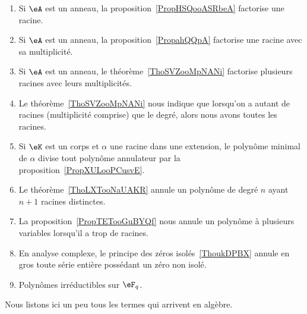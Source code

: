\begin{description}
    \begin{enumerate}
        \item
            Si \( \eA\) est un anneau, la proposition~\ref{PropHSQooASRbeA} factorise une racine.
        \item
            Si \( \eA\) est un anneau, la proposition~\ref{PropahQQpA} factorise une racine avec sa multiplicité.
        \item
            Si \( \eA\) est un anneau, le théorème~\ref{ThoSVZooMpNANi} factorise plusieurs racines avec leurs multiplicités.
        \item
            Le théorème~\ref{ThoSVZooMpNANi} nous indique que lorsqu'on a autant de racines (multiplicité comprise) que le degré, alors nous avons toutes les racines.
        \item
            Si \( \eK\) est un corps et \( \alpha\) une racine dans une extension, le polynôme minimal de \( \alpha\) divise tout polynôme annulateur par la proposition~\ref{PropXULooPCusvE}.
        \item
            Le théorème~\ref{ThoLXTooNaUAKR} annule un polynôme de degré \( n\) ayant \( n+1\) racines distinctes.
        \item
            La proposition~\ref{PropTETooGuBYQf} nous annule un polynôme à plusieurs variables lorsqu'il a trop de racines.
        \item
            En analyse complexe, le principe des zéros isolés~\ref{ThoukDPBX} annule en gros toute série entière possédant un zéro non isolé.
        \item
            Polynômes irréductibles sur \( \eF_q\).
        \end{enumerate}

\end{description}

      \label{THEMEooVIQIooOcFAQS}

Nous listons ici un peu tous les termes qui arrivent en algèbre.

